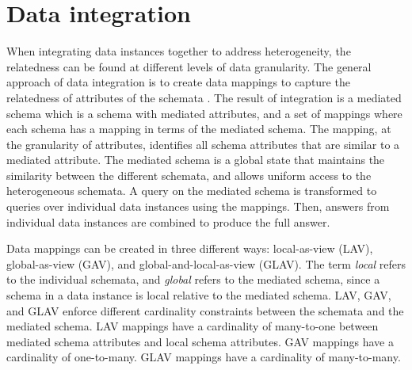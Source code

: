 \section{Data integration}
\label{sec:DataIntegration}

When integrating data instances together to address heterogeneity, the relatedness can be found at different levels of data granularity. The general approach of data integration is to create data mappings to capture the relatedness of attributes of the schemata \cite{Lenzerini2002Data}. The result of integration is a mediated schema which is a schema with mediated attributes, and a set of mappings where each schema has a mapping in terms of the mediated schema. The mapping, at the granularity of attributes, identifies all schema attributes that are similar to a mediated attribute. The mediated schema is a global state that maintains the similarity between the different schemata, and allows uniform access to the heterogeneous schemata. A query on the mediated schema is transformed to queries over individual data instances using the mappings. Then, answers from individual data instances are combined to produce the full answer.

Data mappings can be created in three different ways: local-as-view (LAV), global-as-view (GAV), and global-and-local-as-view (GLAV). The term \textit{local} refers to the individual schemata, and \textit{global} refers to the mediated schema, since a schema in a data instance is local relative to the mediated schema. LAV, GAV, and GLAV enforce different cardinality constraints between the schemata and the mediated schema. LAV mappings have a cardinality of many-to-one between mediated schema attributes and local schema attributes. GAV mappings have a cardinality of one-to-many. GLAV mappings have a cardinality of many-to-many.

